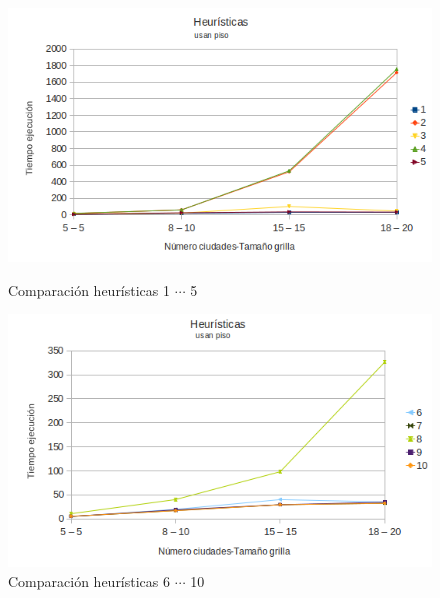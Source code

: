 \documentclass[10pt]{article}
\begin{document}
\begin{figure}[ht]

\begin{minipage}[b]{0.45\linewidth}
 \centering
 \includegraphics[width=\textwidth]{heuristicas0.png}
 \caption{Comparación heurísticas  1 $\cdots$ 5}
 \label{fig:heu0}
\end{minipage}
\hspace{0.5cm}
\begin{minipage}[b]{0.45\linewidth}
 \centering
 \includegraphics[width=\textwidth]{heuristicas1.png}
 \caption{Comparación heurísticas  6 $\cdots$ 10}
 \label{fig:heu1}
\end{minipage}


\end{figure}
\end{document}
